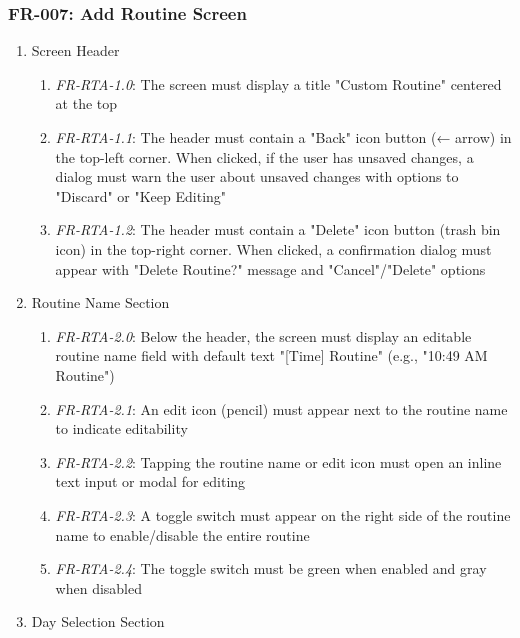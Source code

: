 \documentclass[conference]{IEEEtran}
\begin{document}
            \subsubsection{FR-007: Add Routine Screen}
                \begin{enumerate}
                    \item Screen Header
                        \begin{enumerate}
                            \item \textit{FR-RTA-1.0}: The screen must display a title "Custom Routine" centered at the top
                            \item \textit{FR-RTA-1.1}: The header must contain a "Back" icon button (← arrow) in the top-left corner. When clicked, if the user has unsaved changes, a dialog must warn the user about unsaved changes with options to "Discard" or "Keep Editing"
                            \item \textit{FR-RTA-1.2}: The header must contain a "Delete" icon button (trash bin icon) in the top-right corner. When clicked, a confirmation dialog must appear with "Delete Routine?" message and "Cancel"/"Delete" options
                        \end{enumerate}
                    \item Routine Name Section
                        \begin{enumerate}
                            \item \textit{FR-RTA-2.0}: Below the header, the screen must display an editable routine name field with default text "[Time] Routine" (e.g., "10:49 AM Routine")
                            \item \textit{FR-RTA-2.1}: An edit icon (pencil) must appear next to the routine name to indicate editability
                            \item \textit{FR-RTA-2.2}: Tapping the routine name or edit icon must open an inline text input or modal for editing
                            \item \textit{FR-RTA-2.3}: A toggle switch must appear on the right side of the routine name to enable/disable the entire routine
                            \item \textit{FR-RTA-2.4}: The toggle switch must be green when enabled and gray when disabled
                        \end{enumerate}
                    \item Day Selection Section
                        \begin{enumerate}

\end{enumerate}
\end{enumerate}
\end{document}
